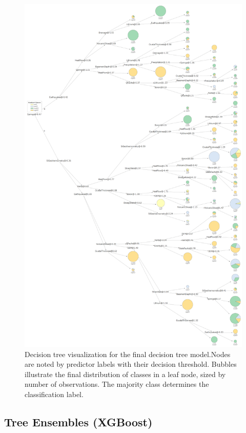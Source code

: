 \begin{figure}[!htp]
\centering
\includegraphics[height=0.85\textheight,keepaspectratio]{templates/images/Figure-DT_viz_portrait.pdf}
\caption[Decision tree visualization]{Decision tree visualization for the final decision tree model.Nodes are noted by predictor labels with their decision threshold. Bubbles illustrate the final distribution of classes in a leaf node, sized by number of observations. The majority class determines the classification label.}
\label{fig:dtree_viz}
\end{figure}

\subsection{Tree Ensembles (XGBoost)}

